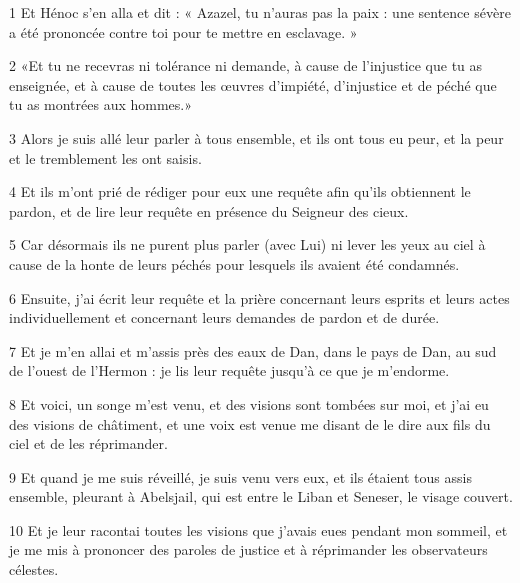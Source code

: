 \par 1 Et Hénoc s'en alla et dit : « Azazel, tu n'auras pas la paix : une sentence sévère a été prononcée contre toi pour te mettre en esclavage. »
\par 2 «Et tu ne recevras ni tolérance ni demande, à cause de l'injustice que tu as enseignée, et à cause de toutes les œuvres d'impiété, d'injustice et de péché que tu as montrées aux hommes.»
\par 3 Alors je suis allé leur parler à tous ensemble, et ils ont tous eu peur, et la peur et le tremblement les ont saisis.
\par 4 Et ils m'ont prié de rédiger pour eux une requête afin qu'ils obtiennent le pardon, et de lire leur requête en présence du Seigneur des cieux.
\par 5 Car désormais ils ne purent plus parler (avec Lui) ni lever les yeux au ciel à cause de la honte de leurs péchés pour lesquels ils avaient été condamnés.
\par 6 Ensuite, j'ai écrit leur requête et la prière concernant leurs esprits et leurs actes individuellement et concernant leurs demandes de pardon et de durée.
\par 7 Et je m'en allai et m'assis près des eaux de Dan, dans le pays de Dan, au sud de l'ouest de l'Hermon : je lis leur requête jusqu'à ce que je m'endorme.
\par 8 Et voici, un songe m'est venu, et des visions sont tombées sur moi, et j'ai eu des visions de châtiment, et une voix est venue me disant de le dire aux fils du ciel et de les réprimander.
\par 9 Et quand je me suis réveillé, je suis venu vers eux, et ils étaient tous assis ensemble, pleurant à Abelsjail, qui est entre le Liban et Seneser, le visage couvert.
\par 10 Et je leur racontai toutes les visions que j'avais eues pendant mon sommeil, et je me mis à prononcer des paroles de justice et à réprimander les observateurs célestes.


